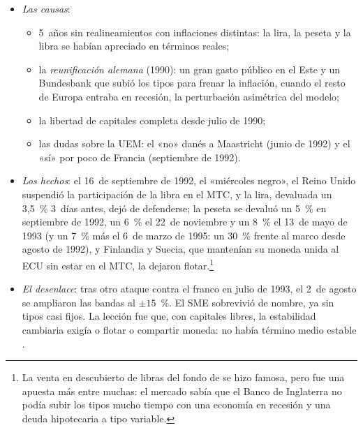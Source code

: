 \documentclass[11pt]{article}
\begin{document}
\begin{itemize}
\item \emph{Las causas}:
  \begin{itemize}
  \item 5~años sin realineamientos con inflaciones distintas: la lira, la peseta y la libra se habían apreciado en términos reales;
  \item la \emph{reunificación alemana} (1990): un gran gasto público en el Este y un Bundesbank que subió los tipos para frenar la inflación, cuando el resto de Europa entraba en recesión, la perturbación asimétrica del modelo;
  \item la libertad de capitales completa desde julio de 1990;
  \item las dudas sobre la UEM: el «no» danés a Maastricht (junio de 1992) y el «sí» por poco de Francia (septiembre de 1992).
  \end{itemize}
\item \emph{Los hechos}\nocite{EichengreenWyplosz1993Unstable}: el 16~de septiembre de 1992, el «miércoles negro», el Reino Unido suspendió la participación de la libra en el MTC\nocite{BoE1992Operation}, y la lira, devaluada un 3,5~\% 3~días antes, dejó de defenderse; la peseta se devaluó un 5~\% en septiembre de 1992, un 6~\% el 22~de noviembre y un 8~\% el 13~de mayo de 1993 (y un 7~\% más el 6~de marzo de 1995: un 30~\% frente al marco desde agosto de 1992)\nocite{BPI1993Informe,BPI1995Informe}, y Finlandia y Suecia, que mantenían su moneda unida al ECU sin estar en el MTC, la dejaron flotar.\footnote{La venta en descubierto de libras del fondo de  se hizo famosa, pero fue una apuesta más entre muchas: el mercado sabía que el Banco de Inglaterra no podía subir los tipos mucho tiempo con una economía en recesión y una deuda hipotecaria a tipo variable.}
\item \emph{El desenlace}: tras otro ataque contra el franco en julio de 1993, el 2~de agosto se ampliaron las bandas al $\pm15$~\%. El SME sobrevivió de nombre, ya sin tipos casi fijos. La lección fue que, con capitales libres, la estabilidad cambiaria exigía o flotar o compartir moneda: no había término medio estable .
\end{itemize}

\begin{infografia}[H]
\centering
\caption{Del Informe Werner al euro de 21~Estados}\label{figu:cronologia}
\end{infografia}
\end{document}
